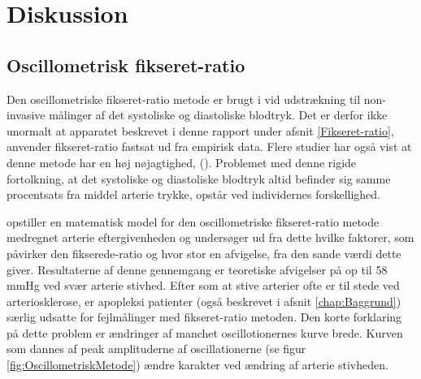 \chapter{Diskussion}

\section{Oscillometrisk fikseret-ratio}
Den oscillometriske fikseret-ratio metode er brugt i vid udstrækning til non-invasive målinger af det systoliske og diastoliske blodtryk. Det er derfor ikke unormalt at apparatet beskrevet i denne rapport under afsnit \ref{Fikseret-ratio}, anvender fikseret-ratio fastsat ud fra empirisk data. Flere studier har også vist at denne metode har en høj nøjagtighed, (\cite{drzewiecki1994theory}). Problemet med denne rigide fortolkning, at det systoliske og diastoliske blodtryk altid befinder sig samme procentsats fra middel arterie trykke, opstår ved individernes forskellighed.

 \cite{RefWorks:13} opstiller en matematisk model for den oscillometriske fikseret-ratio metode medregnet arterie eftergivenheden og undersøger ud fra dette hvilke faktorer, som påvirker den fikserede-ratio og hvor stor en afvigelse, fra den sande værdi dette giver. Resultaterne af denne gennemgang er teoretiske afvigelser på op til 58 mmHg ved svær arterie stivhed. Efter som at stive arterier ofte er til stede ved  arteriosklerose, er apopleksi patienter (også beskrevet i afsnit \ref{chap:Baggrund}) særlig udsatte for fejlmålinger med fikseret-ratio metoden. Den korte forklaring på dette problem er ændringer af manchet oscillotionernes kurve brede. Kurven som dannes af peak amplituderne af oscillationerne (se figur \ref{fig:OscillometriskMetode}) ændre karakter ved ændring af arterie stivheden. 

